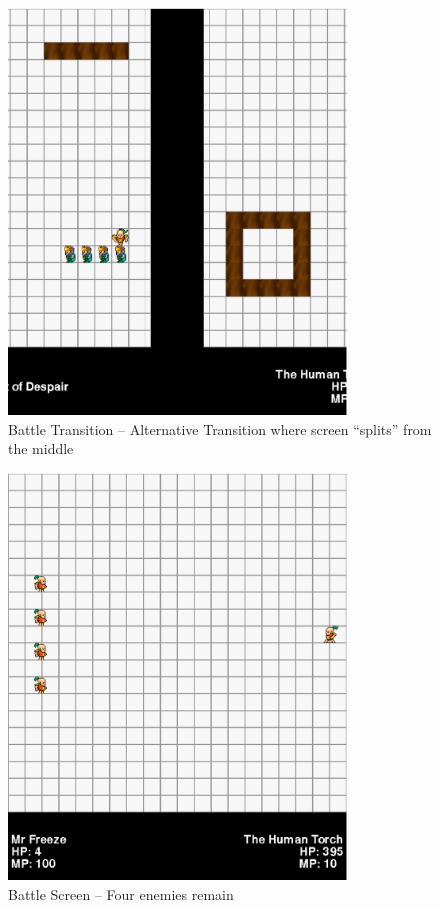 \documentclass[11pt]{article}
\begin{document}
\begin{figure}[h!]
\begin{center}
\leavevmode
\includegraphics[width=0.8\textwidth]{images/overworld_horizsplit}
\end{center}
\caption{Battle Transition -- Alternative Transition where screen ``splits'' from the middle}
\end{figure}
\newpage

\begin{figure}[h!]
\begin{center}
\leavevmode
\includegraphics[width=0.8\textwidth]{images/battle_start}
\end{center}
\caption{Battle Screen -- Four enemies remain}
\end{figure}
\newpage
\end{document}
